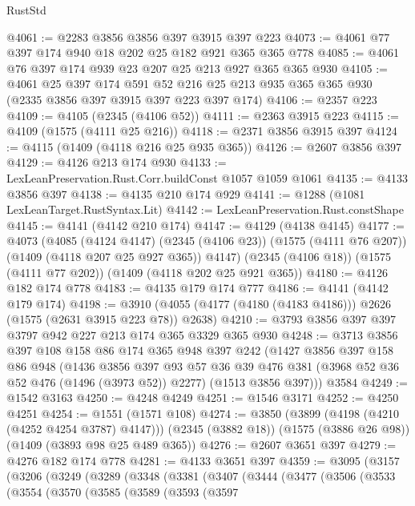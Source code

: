 \begin{lexlean}{RustStd}
\begin{coremodule}
{\begin{coremodule}
{{{{{{{{{{@4061 := @2283 @3856 @3856 @397 @3915 @397 @223
@4073 := @4061 @77 @397 @174 @940 @18 @202 @25 @182 @921 @365 @365 @778
@4085 := @4061 @76 @397 @174 @939 @23 @207 @25 @213 @927 @365 @365 @930
@4105 := @4061
    @25
    @397
    @174
    @591
    @52
    @216
    @25
    @213
    @935
    @365
    @365
    @930
    (@2335 @3856 @397 @3915 @397 @223 @397 @174)
@4106 := @2357 @223
@4109 := @4105 (@2345 (@4106 @52))
@4111 := @2363 @3915 @223
@4115 := @4109 (@1575 (@4111 @25 @216))
@4118 := @2371 @3856 @3915 @397
@4124 := @4115 (@1409 (@4118 @216 @25 @935 @365))
@4126 := @2607 @3856 @397
@4129 := @4126 @213 @174 @930
@4133 := LexLeanPreservation.Rust.Corr.buildConst @1057 @1059 @1061
@4135 := @4133 @3856 @397
@4138 := @4135 @210 @174 @929
@4141 := @1288 (@1081 LexLeanTarget.RustSyntax.Lit)
@4142 := LexLeanPreservation.Rust.constShape
@4145 := @4141 (@4142 @210 @174)
@4147 := @4129 (@4138 @4145)
@4177 := @4073
    (@4085
      (@4124 @4147)
      (@2345 (@4106 @23))
      (@1575 (@4111 @76 @207))
      (@1409 (@4118 @207 @25 @927 @365))
      @4147)
    (@2345 (@4106 @18))
    (@1575 (@4111 @77 @202))
    (@1409 (@4118 @202 @25 @921 @365))
@4180 := @4126 @182 @174 @778
@4183 := @4135 @179 @174 @777
@4186 := @4141 (@4142 @179 @174)
@4198 := @3910 (@4055 (@4177 (@4180 (@4183 @4186))) @2626 (@1575 (@2631 @3915 @223 @78)) @2638)
@4210 := @3793 @3856 @397 @397 @3797 @942 @227 @213 @174 @365 @3329 @365 @930
@4248 := @3713
    @3856
    @397
    @108
    @158
    @86
    @174
    @365
    @948
    @397
    @242
    (@1427
      @3856
      @397
      @158
      @86
      @948
      (@1436
        @3856
        @397
        @93
        @57
        @36
        @39
        @476
        @381
        (@3968 @52 @36 @52 @476 (@1496 (@3973 @52)) @2277)
        (@1513 @3856 @397)))
    @3584
@4249 := @1542 @3163
@4250 := @4248 @4249
@4251 := @1546 @3171
@4252 := @4250 @4251
@4254 := @1551 (@1571 @108)
@4274 := @3850
    (@3899 (@4198 (@4210 (@4252 @4254 @3787) @4147)))
    (@2345 (@3882 @18))
    (@1575 (@3886 @26 @98))
    (@1409 (@3893 @98 @25 @489 @365))
@4276 := @2607 @3651 @397
@4279 := @4276 @182 @174 @778
@4281 := @4133 @3651 @397
@4359 := @3095
    (@3157
      (@3206
        (@3249
          (@3289
            (@3348
              (@3381
                (@3407
                  (@3444
                    (@3477
                      (@3506
                        (@3533
                          (@3554
                            (@3570
                              (@3585
                                (@3589
                                  (@3593
                                    (@3597
}}}}}}}}}}
\end{coremodule}}
\end{coremodule}
\end{lexlean}
